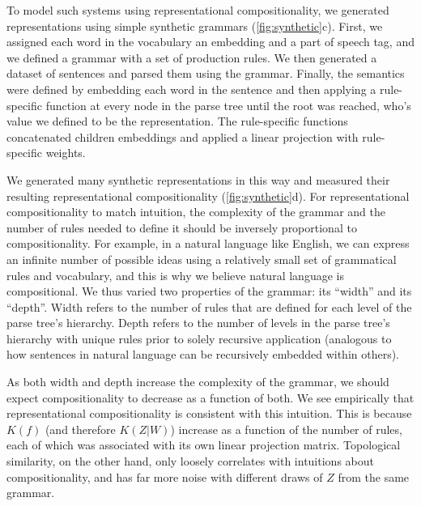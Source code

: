 \documentclass{article}
\newcommand{\comp}{representational compositionality}
\begin{document}
To model such systems using \comp{}, we generated representations using simple synthetic grammars (\cref{fig:synthetic}c). First, we assigned each word in the vocabulary an embedding and a part of speech tag, and we defined a grammar with a set of production rules. We then generated a dataset of sentences and parsed them using the grammar. Finally, the semantics were defined by embedding each word in the sentence and then applying a rule-specific function at every node in the parse tree until the root was reached, who's value we defined to be the representation. The rule-specific functions concatenated children embeddings and applied a linear projection with rule-specific weights.

We generated many synthetic representations in this way and measured their resulting \comp{} (\cref{fig:synthetic}d). For \comp{} to match intuition, the complexity of the grammar and the number of rules needed to define it should be inversely proportional to compositionality. For example, in a natural language like English, we can express an infinite number of possible ideas using a relatively small set of grammatical rules and vocabulary, and this is why we believe natural language is compositional. We thus varied two properties of the grammar: its ``width'' and its ``depth''. Width refers to the number of rules that are defined for each level of the parse tree's hierarchy. Depth refers to the number of levels in the parse tree's hierarchy with unique rules prior to solely recursive application (analogous to how sentences in natural language can be recursively embedded within others).

As both width and depth increase the complexity of the grammar, we should expect compositionality to decrease as a function of both. We see empirically that \comp{} is consistent with this intuition. This is because $K(f)$ (and therefore $K(Z|W)$) increase as a function of the number of rules, each of which was associated with its own linear projection matrix. Topological similarity, on the other hand, only loosely correlates with intuitions about compositionality, and has far more noise with different draws of $Z$ from the same grammar.

\end{document}
